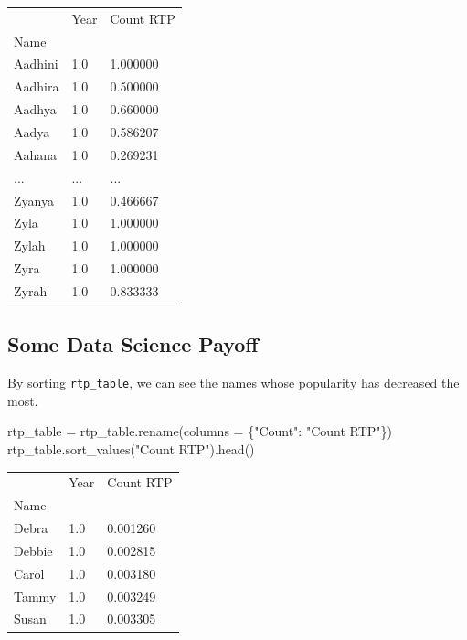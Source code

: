 \documentclass[
  letterpaper,
  DIV=11,
  numbers=noendperiod]{scrreprt}
\newenvironment{Shaded}{\begin{snugshade}}{\end{snugshade}}
\newcommand{\NormalTok}[1]{\textcolor[rgb]{0.00,0.23,0.31}{#1}}
\newcommand{\OperatorTok}[1]{\textcolor[rgb]{0.37,0.37,0.37}{#1}}
\newcommand{\StringTok}[1]{\textcolor[rgb]{0.13,0.47,0.30}{#1}}
\begin{document}
\begin{longtable}[]{@{}lll@{}}
\toprule\noalign{}
& Year & Count RTP \\
Name & & \\
\midrule\noalign{}
\endhead
\bottomrule\noalign{}
\endlastfoot
Aadhini & 1.0 & 1.000000 \\
Aadhira & 1.0 & 0.500000 \\
Aadhya & 1.0 & 0.660000 \\
Aadya & 1.0 & 0.586207 \\
Aahana & 1.0 & 0.269231 \\
... & ... & ... \\
Zyanya & 1.0 & 0.466667 \\
Zyla & 1.0 & 1.000000 \\
Zylah & 1.0 & 1.000000 \\
Zyra & 1.0 & 1.000000 \\
Zyrah & 1.0 & 0.833333 \\
\end{longtable}

\subsection{Some Data Science Payoff}\label{some-data-science-payoff}

By sorting \texttt{rtp\_table}, we can see the names whose popularity
has decreased the most.

\begin{Shaded}
\begin{Highlighting}[]
\NormalTok{rtp\_table }\OperatorTok{=}\NormalTok{ rtp\_table.rename(columns }\OperatorTok{=}\NormalTok{ \{}\StringTok{"Count"}\NormalTok{: }\StringTok{"Count RTP"}\NormalTok{\})}
\NormalTok{rtp\_table.sort\_values(}\StringTok{"Count RTP"}\NormalTok{).head()}
\end{Highlighting}
\end{Shaded}

\begin{longtable}[]{@{}lll@{}}
\toprule\noalign{}
& Year & Count RTP \\
Name & & \\
\midrule\noalign{}
\endhead
\bottomrule\noalign{}
\endlastfoot
Debra & 1.0 & 0.001260 \\
Debbie & 1.0 & 0.002815 \\
Carol & 1.0 & 0.003180 \\
Tammy & 1.0 & 0.003249 \\
Susan & 1.0 & 0.003305 \\
\end{longtable}
\end{document}
